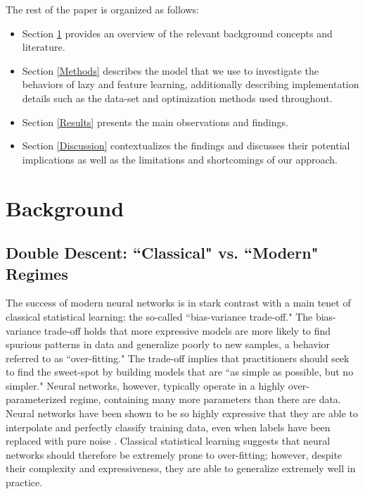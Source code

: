 \documentclass[11pt]{article}
\begin{document}
The rest of the paper is organized as follows:
\begin{itemize}
    \item Section \ref{Background} provides an overview of the relevant background concepts and literature.
    \item Section \ref{Methods} describes the model that we use to investigate the behaviors of lazy and feature learning, additionally describing implementation details such as the data-set and optimization methods used throughout.
    \item Section \ref{Results} presents the main observations and findings.
    \item Section \ref{Discussion} contextualizes the findings and discusses their potential implications as well as the limitations and shortcomings of our approach.
\end{itemize}

\section{Background}
\label{Background}

\subsection{Double Descent: ``Classical" vs. ``Modern" Regimes}

The success of modern neural networks is in stark contrast with a main tenet of classical statistical learning: the so-called ``bias-variance trade-off." The bias-variance trade-off holds that more expressive models are more likely to find spurious patterns in data and generalize poorly to new samples, a behavior referred to as ``over-fitting." The trade-off implies that practitioners should seek to find the sweet-spot by building models that are ``as simple as possible, but no simpler." Neural networks, however, typically operate in a highly over-parameterized regime, containing many more parameters than there are data. Neural networks have been shown to be so highly expressive that they are able to interpolate and perfectly classify training data, even when labels have been replaced with pure noise \cite{zhangUnderstandingDeepLearning2017}. Classical statistical learning suggests that neural networks should therefore be extremely prone to over-fitting; however, despite their complexity and expressiveness, they are able to generalize extremely well in practice.\\
\end{document}
